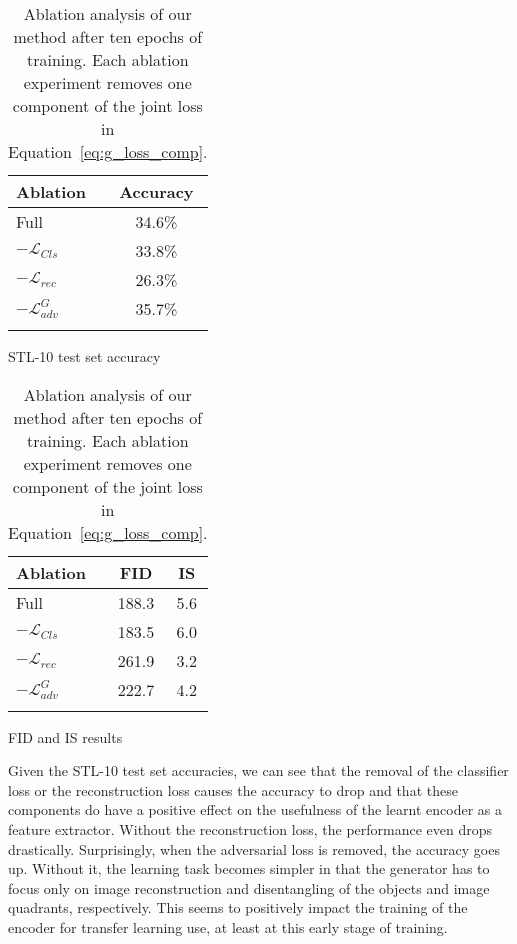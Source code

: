 \documentclass[a4paper,12pt]{report}
\begin{document}
\begin{table}[ht!]
    \begin{subtable}{.5\linewidth}
      \centering
        \begin{tabular}{l c}
        \Xhline{0.8pt}
        \textbf{Ablation} & \textbf{Accuracy} \\
        \hline
        Full & 34.6\% \\ %
        $-\mathcal{L}_{Cls}$ & 33.8\% \\ %
        $-\mathcal{L}_{rec}$ & 26.3\% \\ %
        $-\mathcal{L}^G_{adv}$ & 35.7\% \\ %
        \Xhline{0.8pt}
        \end{tabular}
        \caption{STL-10 test set accuracy}
    \end{subtable}%
    \begin{subtable}{.5\linewidth}
      \centering
        \begin{tabular}{l c c}
        \Xhline{0.8pt}
        \textbf{Ablation} & \textbf{FID} & \textbf{IS} \\
        \hline
        Full & 188.3 & 5.6\\ %
        $-\mathcal{L}_{Cls}$ & 183.5 & 6.0\\ %
        $-\mathcal{L}_{rec}$ & 261.9 & 3.2\\ %
        $-\mathcal{L}^G_{adv}$ & 222.7 & 4.2\\ %
        \Xhline{0.8pt}
        \end{tabular}
        \caption{FID and IS results}
    \end{subtable} 
    \caption[Ablation analysis of our method.]{Ablation analysis of our method after ten epochs of training. Each ablation experiment removes one component of the joint loss in Equation~\ref{eq:g_loss_comp}.}
    \label{tab:ablation_stL10}
\end{table}

Given the STL-10 test set accuracies, we can see that the removal of the classifier loss or the reconstruction loss causes the accuracy to drop and that these components do have a positive effect on the usefulness of the learnt encoder as a feature extractor. Without the reconstruction loss, the performance even drops drastically. Surprisingly, when the adversarial loss is removed, the accuracy goes up. Without it, the learning task becomes simpler in that the generator has to focus only on image reconstruction and disentangling of the objects and image quadrants, respectively. This seems to positively impact the training of the encoder for transfer learning use, at least at this early stage of training. 
\end{document}
